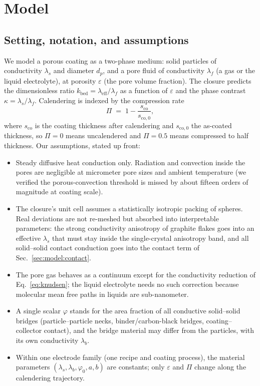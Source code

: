 \documentclass[10pt,a4paper]{article}
\newcommand{\leff}{\lambda_{\mathrm{eff}}}
\newcommand{\lams}{\lambda_{s}}
\newcommand{\lamf}{\lambda_{f}}
\newcommand{\lamb}{\lambda_{b}}
\begin{document}
\section{Model}
\label{sec:model}

\subsection{Setting, notation, and assumptions}
\label{sec:model:setup}

We model a porous coating as a two-phase medium: solid particles of conductivity $\lams$ and diameter $d_p$, and a pore fluid of conductivity $\lamf$ (a gas or the liquid electrolyte), at porosity $\varepsilon$ (the pore volume fraction). The closure predicts the dimensionless ratio $k_{\mathrm{bed}}=\leff/\lamf$ as a function of $\varepsilon$ and the phase contrast $\kappa=\lams/\lamf$. Calendering is indexed by the compression rate
\begin{equation}
\Pi \;=\; 1-\frac{s_{\mathrm{co}}}{s_{\mathrm{co},0}},
\label{eq:Pi}
\end{equation}
where $s_{\mathrm{co}}$ is the coating thickness after calendering and $s_{\mathrm{co},0}$ the as-coated thickness, so $\Pi=0$ means uncalendered and $\Pi=0.5$ means compressed to half thickness. Our assumptions, stated up front:

\begin{itemize}
\item[\textbf{A1}] Steady diffusive heat conduction only. Radiation and convection inside the pores are negligible at micrometer pore sizes and ambient temperature (we verified the porous-convection threshold is missed by about fifteen orders of magnitude at coating scale).
\item[\textbf{A2}] The closure's unit cell assumes a statistically isotropic packing of spheres. Real deviations are not re-meshed but absorbed into interpretable parameters: the strong conductivity anisotropy of graphite flakes goes into an effective $\lams$ that must stay inside the single-crystal anisotropy band, and all solid--solid contact conduction goes into the contact term of Sec.~\ref{sec:model:contact}.
\item[\textbf{A3}] The pore gas behaves as a continuum except for the conductivity reduction of Eq.~\eqref{eq:knudsen}; the liquid electrolyte needs no such correction because molecular mean free paths in liquids are sub-nanometer.
\item[\textbf{A4}] A single scalar $\varphi$ stands for the area fraction of all conductive solid--solid bridges (particle--particle necks, binder/carbon-black bridges, coating--collector contact), and the bridge material may differ from the particles, with its own conductivity $\lamb$.
\item[\textbf{A5}] Within one electrode family (one recipe and coating process), the material parameters $(\lams,\lamb,\varphi_0,a,b)$ are constants; only $\varepsilon$ and $\Pi$ change along the calendering trajectory.
\end{itemize}
\end{document}

